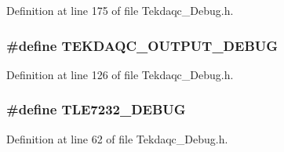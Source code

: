 Definition at line 175 of file Tekdaqc\-\_\-\-Debug.\-h.

\hypertarget{group__driver__debug_ga554ddb4cbcade037bed480f30c6ecb10}{
\subsubsection[{T\-E\-K\-D\-A\-Q\-C\-\_\-\-O\-U\-T\-P\-U\-T\-\_\-\-D\-E\-B\-U\-G}]{\setlength{\rightskip}{0pt plus 5cm}\#define T\-E\-K\-D\-A\-Q\-C\-\_\-\-O\-U\-T\-P\-U\-T\-\_\-\-D\-E\-B\-U\-G}}\label{group__driver__debug_ga554ddb4cbcade037bed480f30c6ecb10}


Definition at line 126 of file Tekdaqc\-\_\-\-Debug.\-h.

\hypertarget{group__driver__debug_gadcf668726728f32b959bd2f9e3fc1be3}{
\subsubsection[{T\-L\-E7232\-\_\-\-D\-E\-B\-U\-G}]{\setlength{\rightskip}{0pt plus 5cm}\#define T\-L\-E7232\-\_\-\-D\-E\-B\-U\-G}}\label{group__driver__debug_gadcf668726728f32b959bd2f9e3fc1be3}


Definition at line 62 of file Tekdaqc\-\_\-\-Debug.\-h.

